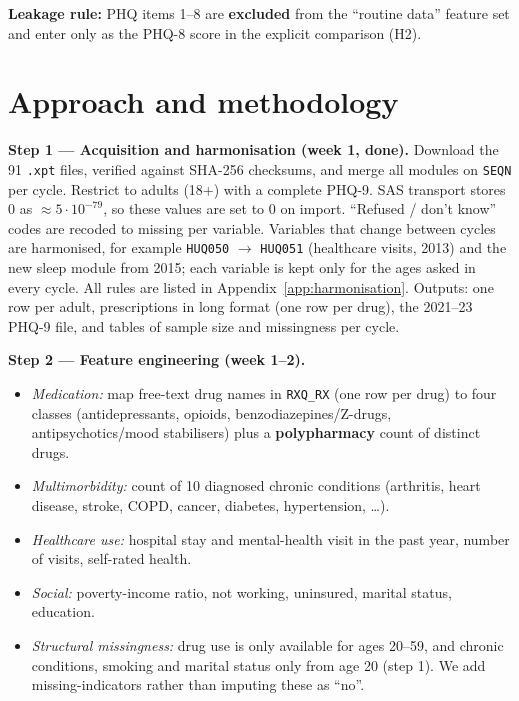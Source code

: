 \documentclass[11pt,a4paper]{article}
\newcommand{\var}[1]{\texttt{#1}}
\begin{document}
\textbf{Leakage rule:} PHQ items 1--8 are \textbf{excluded} from the ``routine data''
feature set and enter only as the PHQ-8 score in the explicit comparison (H2).

\section{Approach and methodology}

\textbf{Step 1 --- Acquisition and harmonisation (week 1, done).} Download the 91
\var{.xpt} files, verified against SHA-256 checksums, and merge all modules on
\var{SEQN} per cycle. Restrict to adults (18+) with a complete PHQ-9. SAS transport
stores 0 as $\approx 5\cdot10^{-79}$, so these values are set to 0 on import.
``Refused / don't know'' codes are recoded to missing per variable. Variables that
change between cycles are harmonised, for example \var{HUQ050} $\rightarrow$
\var{HUQ051} (healthcare visits, 2013) and the new sleep module from 2015; each
variable is kept only for the ages asked in every cycle. All rules are listed in
Appendix~\ref{app:harmonisation}. Outputs: one row per adult, prescriptions in long
format (one row per drug), the 2021--23 PHQ-9 file, and tables of sample size and
missingness per cycle.

\textbf{Step 2 --- Feature engineering (week 1--2).}
\begin{itemize}
  \item \textit{Medication:} map free-text drug names in \var{RXQ\_RX} (one row per
        drug) to four classes (antidepressants, opioids, benzodiazepines/Z-drugs,
        antipsychotics/mood stabilisers) plus a \textbf{polypharmacy} count of
        distinct drugs.
  \item \textit{Multimorbidity:} count of 10 diagnosed chronic conditions (arthritis,
        heart disease, stroke, COPD, cancer, diabetes, hypertension, \ldots).
  \item \textit{Healthcare use:} hospital stay and mental-health visit in the past
        year, number of visits, self-rated health.
  \item \textit{Social:} poverty-income ratio, not working, uninsured, marital status,
        education.
  \item \textit{Structural missingness:} drug use is only available for ages 20--59,
        and chronic conditions, smoking and marital status only from age 20 (step 1).
        We add missing-indicators rather than imputing these as ``no''.
\end{itemize}
\end{document}
